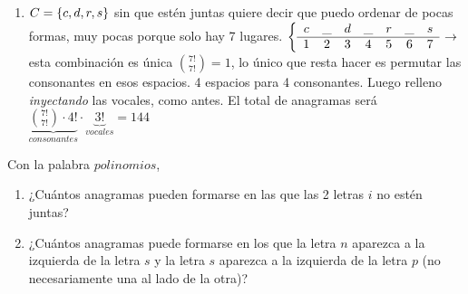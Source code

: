\documentclass[12pt,a4paper, spanish]{article}
\begin{document}
\begin{enumerate}[label=\roman*)]
	\item $C = \left\{ c,d,r,s \right\}$ sin que estén juntas quiere decir que puedo ordenar de pocas formas, muy pocas porque solo hay 7 lugares.
	      $\llave{c c c c c c c c} %
		      {
			      c & \_ & d & \_ & r & \_ & s\\ \hline
			      1 & 2 & 3 & 4 & 5 & 6 & 7
		      } \to
	      $ esta combinación es única $\binom{7!}{7!} = 1$, lo único que resta hacer es permutar las consonantes en esos espacios. 4
	      espacios para 4 consonantes.
	      Luego relleno \textit{inyectando} las vocales, como antes. El total de anagramas será
	      $\underbrace{\binom{7!}{7!} \cdot 4!}_{consonantes} \cdot \underbrace{3!}_{vocales} = 144 $

\end{enumerate}

\ejercicio

Con la palabra $polinomios$,

\begin{enumerate}[label=\roman*)]
	\item ¿Cuántos anagramas pueden formarse en las que las 2 letras $i$ no estén juntas?
	\item ¿Cuántos anagramas puede formarse en los que la letra $n$ aparezca a la izquierda de la letra $s$ y
	      la letra $s$ aparezca a la izquierda de la letra $p$ (no necesariamente una al lado de la otra)?
\end{enumerate}

\separadorCorto
\end{document}
